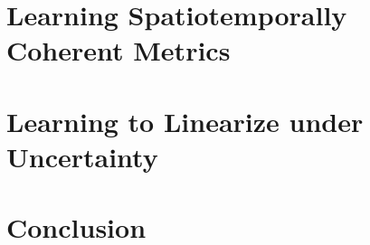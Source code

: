 \documentclass[12pt,letterpaper]{report}
\newcommand{\appendixchapter}[1]{%
    \refstepcounter{appendixchapter}%
    \refstepcounter{chapter}%
    \renewcommand{\DOTIS}[1]{\DOCH \DOTI{#1}}
    \chapter*{#1}
    \addcontentsline{apx}{appendixchapter}{Appendix \protect\numberline{\theappendixchapter}#1}\par%
    \vspace {-1.47cm}}
\renewcommand{\theappendixchapter}{\Alph{appendixchapter}}
\begin{document}
\chapter{Learning Spatiotemporally Coherent Metrics}
\label{chapter:slow} 

\chapter{Learning to Linearize under Uncertainty}
\label{chapter:linear} 

\chapter{Conclusion} 
\label{chapter:conclusion} 
 
\FloatBarrier
\clearpage



\FloatBarrier
\newpage

\singlespacing
\printbibliography
\end{document}
